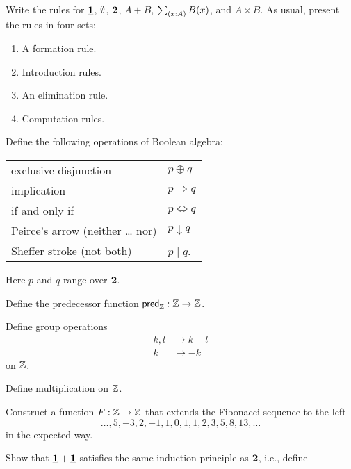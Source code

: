 \begin{exercises}
\item Write the rules for $\underline{\mathbf{1}}$, $\emptyset$, $\mathbf{2}$, $A+B$, $\sm{x:A}B(x)$, and $A\times B$. As usual, present the rules in four sets:
  \begin{enumerate}
  \item A formation rule.
  \item Introduction rules.
  \item An elimination rule.
  \item Computation rules.
  \end{enumerate}
\item \label{ex:boolean-operation}Define the following operations of Boolean algebra:
  \begin{center}
    \begin{tabular}{ll}
      exclusive disjunction & $p \oplus q$ \\
      implication & $p \Rightarrow q$ \\
      if and only if & $p \Leftrightarrow q$ \\
      Peirce's arrow (neither \dots{} nor) & $p \downarrow q$ \\
      Sheffer stroke (not both) & $p\mid q$.
    \end{tabular}
  \end{center}
  Here $p$ and $q$ range over $\mathbf{2}$. 
\item \label{ex:int_pred}Define the predecessor function $\mathsf{pred}_{\mathbb{Z}}:{\mathbb{Z}}\to {\mathbb{Z}}$.
\item \label{ex:int_group_ops}Define group operations
  \begin{align*}
    k,l & \mapsto k+l \\
    k & \mapsto -k
  \end{align*}
  on ${\mathbb{Z}}$.
\item Define multiplication on ${\mathbb{Z}}$.
\item Construct a function $F:{\mathbb{Z}}\to{\mathbb{Z}}$ that extends the Fibonacci sequence to the left
  \begin{equation*}
    \ldots,5,-3,2,-1,1,0,1,1,2,3,5,8,13,\ldots
  \end{equation*}
  in the expected way.
\item \label{ex:one_plus_one} Show that $\underline{\mathbf{1}}+\underline{\mathbf{1}}$ satisfies the same induction principle as $\mathbf{2}$, i.e., define

\end{exercises}
